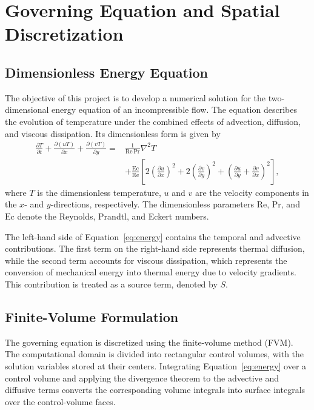 \section{Governing Equation and Spatial Discretization}
\label{sec:governing_equation}

\subsection{Dimensionless Energy Equation}

The objective of this project is to develop a numerical solution
for the two-dimensional energy equation of an incompressible flow.
The equation describes the evolution of temperature under the
combined effects of advection, diffusion, and viscous dissipation.
Its dimensionless form is given by
\begin{equation}
\begin{aligned}
\frac{\partial T}{\partial t}
+\frac{\partial (uT)}{\partial x}
+\frac{\partial (vT)}{\partial y}
={}&
\frac{1}{\mathrm{Re}\,\mathrm{Pr}}\nabla^2 T
\\
&+
\frac{\mathrm{Ec}}{\mathrm{Re}}
\left[
2\left(\frac{\partial u}{\partial x}\right)^2
+2\left(\frac{\partial v}{\partial y}\right)^2
+\left(
\frac{\partial u}{\partial y}
+\frac{\partial v}{\partial x}
\right)^2
\right],
\end{aligned}
\label{eq:energy}
\end{equation}
where $T$ is the dimensionless temperature, $u$ and $v$ are the
velocity components in the $x$- and $y$-directions, respectively.
The dimensionless parameters $\mathrm{Re}$, $\mathrm{Pr}$, and
$\mathrm{Ec}$ denote the Reynolds, Prandtl, and Eckert numbers.

The left-hand side of Equation~\eqref{eq:energy} contains the
temporal and advective contributions. The first term on the
right-hand side represents thermal diffusion, while the second
term accounts for viscous dissipation, which represents the
conversion of mechanical energy into thermal energy due to
velocity gradients. This contribution is treated as a source
term, denoted by $S$.

\subsection{Finite-Volume Formulation}

The governing equation is discretized using the finite-volume
method (FVM). The computational domain is divided into
rectangular control volumes, with the solution variables stored
at their centers. Integrating Equation~\eqref{eq:energy} over
a control volume and applying the divergence theorem to the
advective and diffusive terms converts the corresponding volume
integrals into surface integrals over the control-volume faces.

